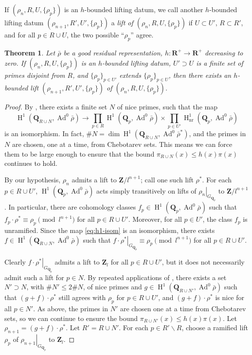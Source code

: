 \documentclass{article}
\DeclareMathOperator{\Ad}{Ad}
\DeclareMathOperator{\h}{H}
\newcommand{\bQ}{\mathbf{Q}}
\newcommand{\bR}{\mathbf{R}}
\newcommand{\bZ}{\mathbf{Z}}
\newcommand{\nr}{\mathrm{nr}}
\newtheorem{theorem}{Theorem}
\begin{document}
If $(\rho_n,R,U,\{\rho_p\})$ is an $h$-bounded lifting datum, we call 
another $h$-bounded lifting datum $(\rho_{n+1},R',U',\{\rho_p\})$ a \emph{lift 
of $(\rho_n,R,U,\{\rho_p\})$} if $U\subset U'$, $R\subset R'$, and for all 
$p\in R\cup U$, the two possible ``$\rho_p$'' agree. 

\begin{theorem}\label{thm:lifting-datum}
Let $\bar\rho$ be a good residual representation, $h\colon \bR^+ \to \bR^+$ 
decreasing to zero. If $(\rho_n,R,U,\{\rho_p\})$ is an $h$-bounded lifting 
datum, $U'\supset U$ is a finite set of primes disjoint from $R$, and 
$\{\rho_p\}_{p\in U'}$ extends $\{\rho_p\}_{p\in U}$, then there exists an 
$h$-bounded lift $(\rho_{n+1},R',U',\{\rho_p\})$ of 
$(\rho_n,R,U,\{\rho_p\})$. 
\end{theorem}
\begin{proof}


By \cite[Lem.~8]{klr}, there exists a finite set $N$ of nice primes, such that 
the map 
\begin{equation}\label{eq:h1-isom}
	\h^1(\bQ_{R\cup N},\Ad^0\bar\rho) \to \prod_{p\in R} \h^1(\bQ_p,\Ad^0\bar\rho) \times \prod_{p\in U'} \h_\nr^1(\bQ_p,\Ad^0\bar\rho) 
\end{equation}
is an isomorphism. In fact, $\# N = \dim\h^1(\bQ_{R\cup N},\Ad^0\bar\rho^\ast)$, 
and the primes in $N$ are chosen, one at a time, from Chebotarev sets. This means 
we can force them to be large enough to ensure that the bound 
$\pi_{R\cup N}(x) \leqslant h(x) \pi(x)$ continues to hold. 

By our hypothesis, $\rho_n$ admits a lift to $\bZ/l^{n+1}$; call one such lift 
$\rho^\ast$. For each $p\in R\cup U'$, $\h^1(\bQ_p,\Ad^0\bar\rho)$ acts simply 
transitively on lifts of $\left.\rho_n\right|_{G_{\bQ_p}}$ to $\bZ/l^{n+1}$. In 
particular, there are cohomology classes $f_p\in \h^1(\bQ_p,\Ad^0\bar\rho)$ 
such that $f_p\cdot \rho^\ast \equiv \rho_p\pmod{l^{n+1}}$ for all 
$p\in R\cup U'$. Moreover, for all $p\in U'$, the class $f_p$ is unramified. 
Since the map \eqref{eq:h1-isom} is an isomorphism, there exists 
$f\in \h^1(\bQ_{R\cup N},\Ad^0\bar\rho)$ such that 
$\left.f\cdot \rho^\ast\right|_{G_{\bQ_p}}\equiv \rho_p\pmod{l^{n+1}}$ for all 
$p\in R\cup U'$. 

Clearly $\left. f\cdot \rho^\ast\right|_{G_{\bQ_p}}$ admits a lift to $\bZ_l$ 
for all $p\in R\cup U'$, but it does not necessarily admit such a lift for 
$p\in N$. By repeated applications of \cite[Prop.~3.10]{pande}, there 
exists a set $N'\supset N$, with $\# N'\leqslant 2\# N$, of nice primes and 
$g\in \h^1(\bQ_{R\cup N'},\Ad^0\bar\rho)$ such that 
$(g+f)\cdot \rho^\ast$ still agrees with $\rho_p$ for $p\in R\cup U'$, and 
$(g+f)\cdot \rho^\ast$ is nice for all $p\in N'$. As above, the primes in $N'$ 
are chosen one at a time from Chebotarev sets, so we can continue to ensure the 
bound $\pi_{R\cup N'}(x)\leqslant h(x) \pi(x)$. Let 
$\rho_{n+1} = (g+f) \cdot \rho^\ast$. Let $R' = R\cup N'$. For each 
$p\in R'\smallsetminus R$, choose a ramified lift $\rho_p$ of 
$\left. \rho_{n+1}\right|_{G_{\bQ_p}}$ to $\bZ_l$. 


\end{proof}
\end{document}
